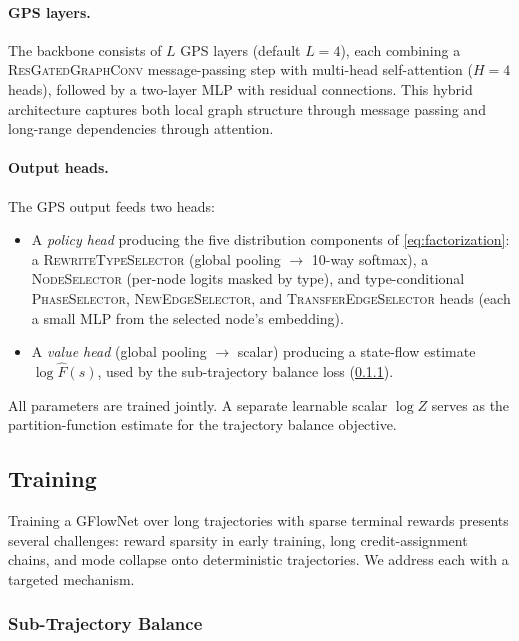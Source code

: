 \documentclass[11pt,a4paper]{article}
\begin{document}
\paragraph{GPS layers.}
The backbone consists of $L$ GPS layers (default $L{=}4$), each combining
a \textsc{ResGatedGraphConv} message-passing step with multi-head
self-attention ($H{=}4$ heads), followed by a two-layer MLP with residual
connections.  This hybrid architecture captures both local graph structure
through message passing and long-range dependencies through attention.

\paragraph{Output heads.}
The GPS output feeds two heads:
\begin{itemize}
\item A \emph{policy head} producing the five distribution components of
\cref{eq:factorization}: a \textsc{RewriteTypeSelector} (global
pooling $\to$ 10-way softmax), a \textsc{NodeSelector} (per-node logits
masked by type), and type-conditional \textsc{PhaseSelector},
\textsc{NewEdgeSelector}, and \textsc{TransferEdgeSelector} heads (each
a small MLP from the selected node's embedding).
\item A \emph{value head} (global pooling $\to$ scalar) producing a
state-flow estimate $\log \hat{F}(s)$, used by the sub-trajectory
balance loss (\cref{sec:subtb}).
\end{itemize}
All parameters are trained jointly.  A separate learnable scalar $\log Z$
serves as the partition-function estimate for the trajectory balance
objective.


\subsection{Training}\label{sec:training}

Training a GFlowNet over long trajectories with sparse terminal rewards
presents several challenges: reward sparsity in early training, long
credit-assignment chains, and mode collapse onto deterministic
trajectories.  We address each with a targeted mechanism.

\subsubsection{Sub-Trajectory Balance}\label{sec:subtb}
\end{document}
